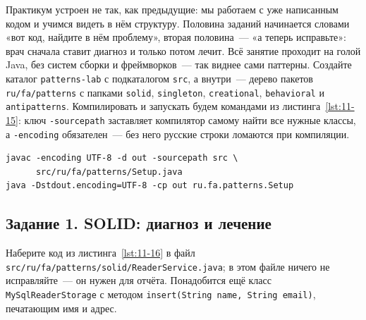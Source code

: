 \praktikum{}

Практикум устроен не так, как предыдущие: мы работаем с уже написанным кодом и
учимся видеть в нём структуру. Половина заданий начинается словами «вот код,
найдите в нём проблему», вторая половина~--- «а теперь исправьте»: врач сначала
ставит диагноз и только потом лечит. Всё занятие проходит на голой Java, без
систем сборки и фреймворков~--- так виднее сами паттерны. Создайте каталог
\texttt{patterns-lab} с подкаталогом \texttt{src}, а внутри~--- дерево пакетов
\texttt{ru/fa/patterns} с папками \texttt{solid}, \texttt{singleton},
\texttt{creational}, \texttt{behavioral} и \texttt{antipatterns}. Компилировать и
запускать будем командами из листинга~\ref{lst:11-15}: ключ
\texttt{-sourcepath} заставляет компилятор самому найти все нужные классы, а
\texttt{-encoding} обязателен~--- без него русские строки ломаются при
компиляции.

\begin{listing}[H]
\begin{verbatim}
javac -encoding UTF-8 -d out -sourcepath src \
      src/ru/fa/patterns/Setup.java
java -Dstdout.encoding=UTF-8 -cp out ru.fa.patterns.Setup
\end{verbatim}
\caption{Шаблон команд сборки и запуска}
\label{lst:11-15}
\end{listing}

\subsection*{Задание 1. SOLID: диагноз и лечение}

Наберите код из листинга~\ref{lst:11-16} в файл
\texttt{src/ru/fa/patterns/solid/ReaderService.java}; в этом файле ничего не
исправляйте~--- он нужен для отчёта. Понадобится ещё класс
\texttt{MySqlReaderStorage} с методом \texttt{insert(String name, String
email)}, печатающим имя и адрес.

